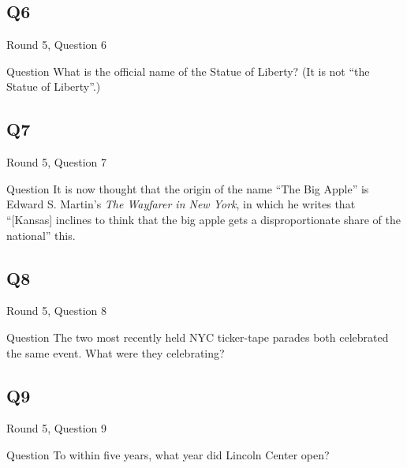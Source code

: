 \documentclass[11pt]{beamer}
\begin{document}
\subsection*{Q6}
\begin{frame}[t]{Round 5, Question 6}
\begin{block}{Question}
What is the official name of the Statue of Liberty? (It is not ``the Statue of Liberty''.)
\end{block}
\end{frame}
\subsection*{Q7}
\begin{frame}[t]{Round 5, Question 7}
\begin{block}{Question}
It is now thought that the origin of the name ``The Big Apple'' is Edward S. Martin's \emph{The Wayfarer in New York}, in which he writes that ``[Kansas] inclines to think that the big apple gets a disproportionate share of the national'' this.
\end{block}
\end{frame}
\subsection*{Q8}
\begin{frame}[t]{Round 5, Question 8}
\begin{block}{Question}
The two most recently held NYC ticker-tape parades both celebrated the same event. What were they celebrating?
\end{block}
\end{frame}
\subsection*{Q9}
\begin{frame}[t]{Round 5, Question 9}
\begin{block}{Question}
To within five years, what year did Lincoln Center open?
\end{block}
\end{frame}
\end{document}
